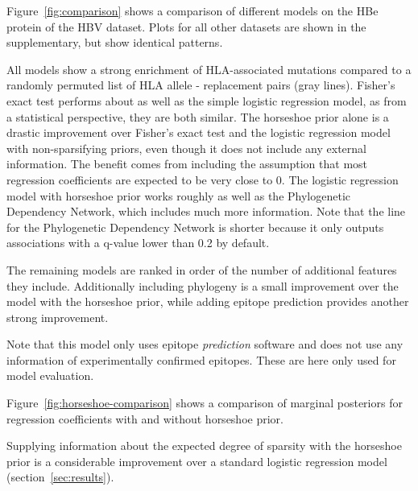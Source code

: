 \documentclass{bioinfo}
\begin{document}
Figure~\ref{fig:comparison} shows a comparison of different models on the HBe protein of the HBV dataset. Plots for all other datasets are shown in the supplementary, but show identical patterns.

All models show a strong enrichment of HLA-associated mutations compared to a randomly permuted list of HLA allele - replacement pairs (gray lines). Fisher's exact test performs about as well as the simple logistic regression model, as from a statistical perspective, they are both similar.
The horseshoe prior alone is a drastic improvement over Fisher's exact test and the logistic regression model with non-sparsifying priors, even though it does not include any external information. The benefit comes from including the assumption that most regression coefficients are expected to be very close to 0.
The logistic regression model with horseshoe prior works roughly as well as the Phylogenetic Dependency Network, which includes much more information.
Note that the line for the Phylogenetic Dependency Network is shorter because it only outputs associations with a q-value lower than 0.2 by default.

The remaining models are ranked in order of the number of additional features they include. Additionally including phylogeny is a small improvement over the model with the horseshoe prior, while adding epitope prediction provides another strong improvement.

Note that this model only uses epitope \textit{prediction} software and does not use any information of experimentally confirmed epitopes. These are here only used for model evaluation.

Figure~\ref{fig:horseshoe-comparison} shows a comparison of marginal posteriors for regression coefficients with and without horseshoe prior.

Supplying information about the expected degree of sparsity with the horseshoe prior is a considerable improvement over a standard logistic regression model  (section~\ref{sec:results}).
\end{document}

